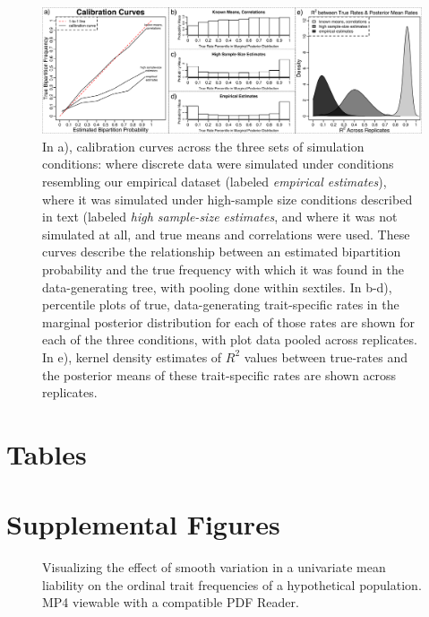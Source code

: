 \documentclass[10pt, twocolumn, twoside]{article}
\begin{document}
\begin{figure}[h]
\centering
\includegraphics[width=160mm]{figures/chpt4_figure8.pdf}
\caption[Calibration Curves for TSAR-MBOP Simulation Study]{In a), calibration curves across the three sets of simulation conditions: where discrete data were simulated under conditions resembling our empirical dataset (labeled \textit{empirical estimates}), where it was simulated under high-sample size conditions described in text (labeled \textit{high sample-size estimates}, and where it was not simulated at all, and true means and correlations were used. These curves describe the relationship between an estimated bipartition probability and the true frequency with which it was found in the data-generating tree, with pooling done within sextiles. In b-d), percentile plots of true, data-generating trait-specific rates in the marginal posterior distribution for each of those rates are shown for each of the three conditions, with plot data pooled across replicates. In e), kernel density estimates of $R^2$ values between true-rates and the posterior means of these trait-specific rates are shown across replicates. \label{overflow}
\label{fig:simsCalibration}
}
\end{figure}

\clearpage

\section{Tables}



\clearpage

\section{Supplemental Figures}

\label{supp:SupplementalFiguresThresholdModel}

\begin{figure}[h]
\centering
{}
\caption[Varying the Location of a Population Mean Under the Univariate Threshold Model]{Visualizing the effect of smooth variation in a univariate mean liability on the ordinal trait frequencies of a hypothetical population. MP4 viewable with a compatible PDF Reader.}
\label{fig:univMuSmooth}
\end{figure}
\end{document}

